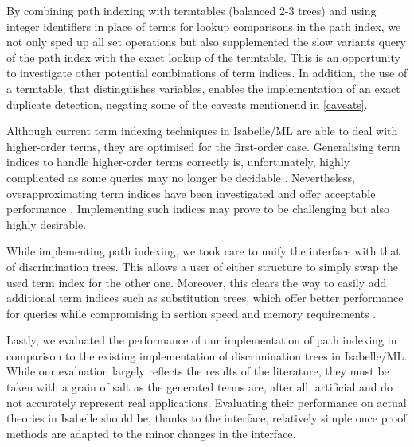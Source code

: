 By combining path indexing with termtables (balanced 2-3 trees) and using integer identifiers in place of terms for lookup comparisons in the path index, we not only sped up all set operations but also supplemented the slow variants query of the path index with the exact lookup of the termtable. This is an opportunity to investigate other potential combinations of term indices. In addition, the use of a termtable, that distinguishes variables, enables the implementation of an exact duplicate detection, negating some of the caveats mentionend in \cref{caveats}.

Although current term indexing techniques in Isabelle/ML are able to deal with higher-order terms, they are optimised for the first-order case.
Generalising term indices to handle higher-order terms correctly is, unfortunately, highly complicated as some queries may no longer be decidable \cite{goldfarb_undecidability_1981}. Nevertheless, overapproximating term indices have been investigated and offer acceptable performance \cite{pientka_higher-order_2009,libal_towards_nodate}. Implementing such indices may prove to be challenging but also highly desirable.

While implementing path indexing, we took care to unify the interface with that of discrimination trees. This allows a user of either structure to simply swap the used term index for the other one. Moreover, this clears the way to easily add additional term indices such as substitution trees, which offer better performance for queries while compromising in sertion speed and memory requirements \cite{carbonell_comparison_1995}.

Lastly, we evaluated the performance of our implementation of path indexing in comparison to the existing implementation of discrimination trees in Isabelle/ML. While our evaluation largely reflects the results of the literature, they must be taken with a grain of salt as the generated terms are, after all, artificial and do not accurately represent real applications. Evaluating their performance on actual theories in Isabelle should be, thanks to the interface, relatively simple once proof methods are adapted to the minor changes in the interface.

